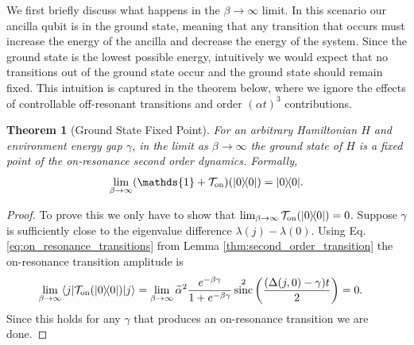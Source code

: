 \documentclass{article}
\newtheorem{theorem}{Theorem}
\newcommand{\on}{\rm on}
\newcommand{\ket}[1]{|#1\rangle}
\newcommand{\bra}[1]{\langle #1|}
\newcommand{\ketbra}[2]{| #1\rangle\! \langle #2|}
\newcommand{\identity}{\mathds{1}}
\DeclareMathOperator{\sinc}{sinc}
\begin{document}

We first briefly discuss what happens in the $\beta \to \infty$ limit. In this scenario our ancilla qubit is in the ground state, meaning that any transition that occurs must increase the energy of the ancilla and decrease the energy of the system. Since the ground state is the lowest possible energy, intuitively we would expect that no transitions out of the ground state occur and the ground state should remain fixed. This intuition is captured in the theorem below, where we ignore the effects of controllable off-resonant transitions and order $(\alpha t)^3$ contributions.
\begin{theorem}[Ground State Fixed Point] \label{thm:ground_state_fixed}
    For an arbitrary Hamiltonian $H$ and environment energy gap $\gamma$, in the limit as $\beta \to \infty$ the ground state of $H$ is a fixed point of the on-resonance second order dynamics. Formally,
    \begin{equation}
        \lim_{\beta \to \infty} (\identity + \mathcal{T}_{\on})(\ketbra{0}{0}) = \ketbra{0}{0}.
    \end{equation}
\end{theorem}
\begin{proof}
    To prove this we only have to show that $\lim_{\beta \to \infty} \mathcal{T}_{\on}(\ketbra{0}{0}) = 0$. Suppose $\gamma$ is sufficiently close to the eigenvalue difference $\lambda(j) - \lambda(0)$. Using Eq. \eqref{eq:on_resonance_transitions} from Lemma \ref{thm:second_order_transition} the on-resonance transition amplitude is
    \begin{align}
        \lim_{\beta \to \infty} \bra{j} \mathcal{T}_{\on}(\ketbra{0}{0}) \ket{j} &= \lim_{\beta \to \infty} \widetilde{\alpha}^2 \frac{e^{-\beta \gamma}}{1 + e^{-\beta \gamma}} \sinc^2 \left( \frac{(\Delta(j,0) - \gamma)t}{2} \right) = 0.
    \end{align}
    Since this holds for any $\gamma$ that produces an on-resonance transition we are done.
\end{proof}
\end{document}
